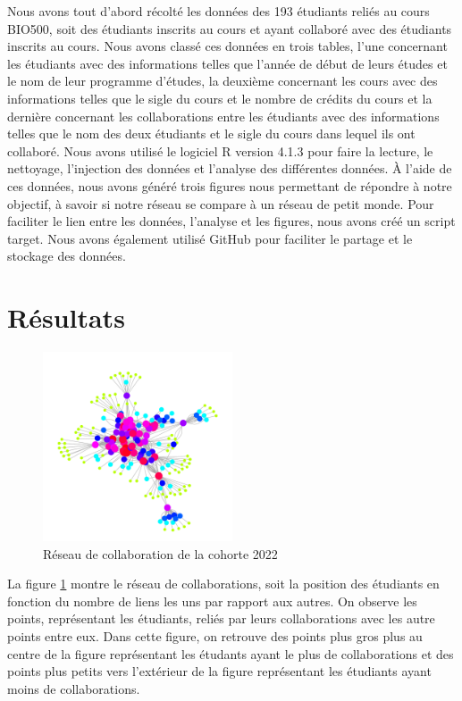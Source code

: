 \documentclass[9pt,twocolumn,twoside,]{pnas-new}
\begin{document}
Nous avons tout d'abord récolté les données des 193 étudiants reliés au
cours BIO500, soit des étudiants inscrits au cours et ayant collaboré
avec des étudiants inscrits au cours. Nous avons classé ces données en
trois tables, l'une concernant les étudiants avec des informations
telles que l'année de début de leurs études et le nom de leur programme
d'études, la deuxième concernant les cours avec des informations telles
que le sigle du cours et le nombre de crédits du cours et la dernière
concernant les collaborations entre les étudiants avec des informations
telles que le nom des deux étudiants et le sigle du cours dans lequel
ils ont collaboré. Nous avons utilisé le logiciel R version 4.1.3 pour
faire la lecture, le nettoyage, l'injection des données et l'analyse des
différentes données. À l'aide de ces données, nous avons généré trois
figures nous permettant de répondre à notre objectif, à savoir si notre
réseau se compare à un réseau de petit monde. Pour faciliter le lien
entre les données, l'analyse et les figures, nous avons créé un script
target. Nous avons également utilisé GitHub pour faciliter le partage et
le stockage des données.

\hypertarget{ruxe9sultats}{%
\section{Résultats}\label{ruxe9sultats}}

\begin{figure}
\centering
\includegraphics[width=0.5\textwidth,height=0.4\textheight]{../results/reseau.pdf}
\caption{Réseau de collaboration de la cohorte 2022 \label{fig:plot1}}
\end{figure}

La figure \ref{fig:plot1} montre le réseau de collaborations, soit la
position des étudiants en fonction du nombre de liens les uns par
rapport aux autres. On observe les points, représentant les étudiants,
reliés par leurs collaborations avec les autre points entre eux. Dans
cette figure, on retrouve des points plus gros plus au centre de la
figure représentant les étudants ayant le plus de collaborations et des
points plus petits vers l'extérieur de la figure représentant les
étudiants ayant moins de collaborations.
\end{document}
